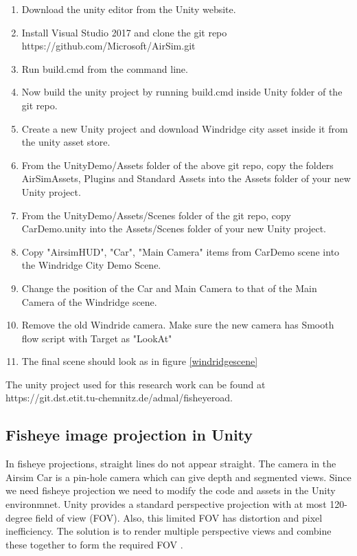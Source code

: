 \documentclass[a4paper, 12pt, oneside, BCOR1cm,toc=chapterentrywithdots]{scrbook}
\begin{document}
\begin{enumerate}
	\item Download the unity editor from the Unity website\cite{unity3d}.
	\item Install Visual Studio 2017 and clone the git repo https://github.com/Microsoft/AirSim.git
	\item Run build.cmd from the command line. 
	\item Now build the unity project by running build.cmd inside Unity folder of the git repo.
	\item Create a new Unity project and download Windridge city asset inside it from the unity asset store.
	\item From the UnityDemo/Assets folder of the above git repo, copy the folders AirSimAssets, Plugins and Standard Assets into the Assets folder of your new Unity project.
	\item From the UnityDemo/Assets/Scenes folder of the git repo, copy CarDemo.unity into the Assets/Scenes folder of your new Unity project.
        \item Copy "AirsimHUD", "Car", "Main Camera" items from CarDemo scene into the Windridge City Demo Scene.
	\item Change the position of the Car and Main Camera to that of the Main Camera of the Windridge scene.
	\item Remove the old Windride camera. Make sure the new camera has Smooth flow script with Target as "LookAt"
	\item The final scene should look as in figure \ref{windridgescene}
\end{enumerate}

The unity project used for this research work can be found at https://git.dst.etit.tu-chemnitz.de/admal/fisheyeroad.

\subsection{Fisheye image projection in Unity}

In fisheye projections, straight lines do not appear straight. The camera in the Airsim Car is a pin-hole camera which can give depth and segmented views. Since we need fisheye projection we need to modify the code and assets in the Unity environmnet. Unity provides a standard perspective projection with at most 120-degree field of view (FOV). Also, this limited FOV has distortion and pixel inefficiency. The solution is to render multiple perspective views and combine these together to form the required FOV \cite{bourke2009idome}.
\end{document}

